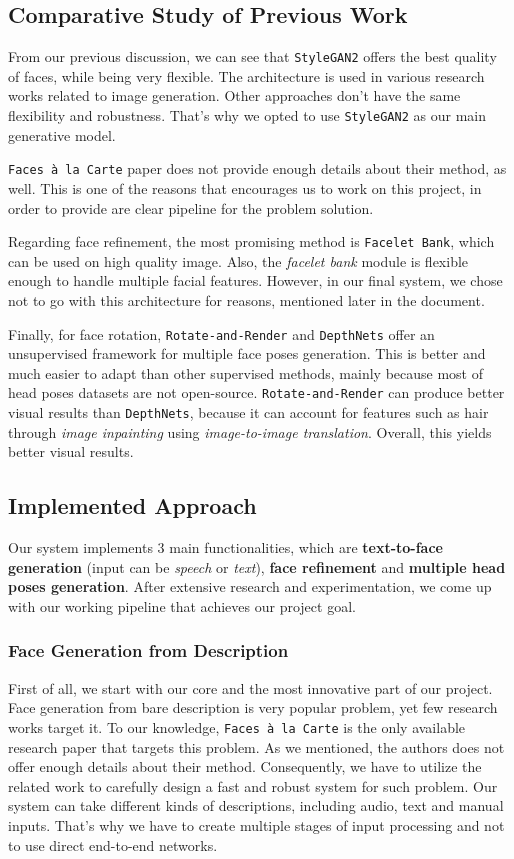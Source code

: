 \newpage

\subsection{Comparative Study of Previous Work}
From our previous discussion, we can see that \texttt{StyleGAN2} offers the best quality of faces, while being very flexible. The architecture is used in various research works related to image generation. Other approaches don't have the same flexibility and robustness. That's why we opted to use \texttt{StyleGAN2} as our main generative model. 

\texttt{Faces à la Carte} paper does not provide enough details about their method, as well. This is one of the reasons that encourages us to work on this project, in order to provide are clear pipeline for the problem solution.

Regarding face refinement, the most promising method is \texttt{Facelet Bank}, which can be used on high quality image. Also, the \emph{facelet bank} module is flexible enough to handle multiple facial features. However, in our final system, we chose not to go with this architecture for reasons, mentioned later in the document.

Finally, for face rotation, \texttt{Rotate-and-Render} and \texttt{DepthNets} offer an unsupervised framework for multiple face poses generation. This is better and much easier to adapt than other supervised methods, mainly because most of head poses datasets are not open-source. \texttt{Rotate-and-Render} can produce better visual results than \texttt{DepthNets}, because it can account for features such as hair through \emph{image inpainting} using \emph{image-to-image translation}. Overall, this yields better visual results.

\subsection{Implemented Approach}
Our system implements $3$ main functionalities, which are \textbf{text-to-face generation} (input can be \emph{speech} or \emph{text}), \textbf{face refinement} and \textbf{multiple head poses generation}. After extensive research and experimentation, we come up with our working pipeline that achieves our project goal.

\subsubsection{Face Generation from Description}
First of all, we start with our core and the most innovative part of our project. Face generation from bare description is very popular problem, yet few research works target it. To our knowledge, \texttt{Faces à la Carte} is the only available research paper that targets this problem. As we mentioned, the authors does not offer enough details about their method. Consequently, we have to utilize the related work to carefully design a fast and robust system for such problem. 
Our system can take different kinds of descriptions, including audio, text and manual inputs. That's why we have to create multiple stages of input processing and not to use direct end-to-end networks. 

